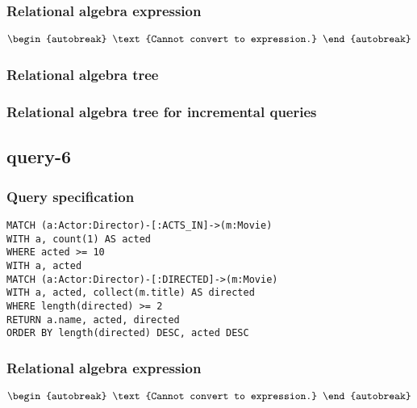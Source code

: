 \subsubsection*{Relational algebra expression}

\begin{align*}
\begin{autobreak}
\text{Cannot convert to expression.}
\end{autobreak}
\end{align*}

\subsubsection*{Relational algebra tree}


\subsubsection*{Relational algebra tree for incremental queries}

\subsection{query-6}

\subsubsection*{Query specification}

\begin{lstlisting}
MATCH (a:Actor:Director)-[:ACTS_IN]->(m:Movie)
WITH a, count(1) AS acted
WHERE acted >= 10
WITH a, acted
MATCH (a:Actor:Director)-[:DIRECTED]->(m:Movie)
WITH a, acted, collect(m.title) AS directed
WHERE length(directed) >= 2
RETURN a.name, acted, directed
ORDER BY length(directed) DESC, acted DESC
\end{lstlisting}

\subsubsection*{Relational algebra expression}

\begin{align*}
\begin{autobreak}
\text{Cannot convert to expression.}
\end{autobreak}
\end{align*}

